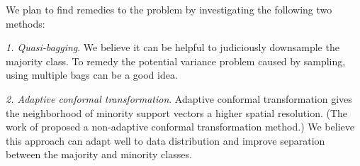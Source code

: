 We plan to find remedies to the problem by investigating 
the following two methods:
\begin{nlist}
 \item {\em 1. Quasi-bagging}.
  We believe it can be helpful to judiciously downsample the majority
  class.  To remedy the potential
  variance problem caused by sampling, using multiple bags
  can be a good idea.  
 \item {\em 2. Adaptive conformal transformation}.
  Adaptive conformal transformation  gives the neighborhood of
  minority support vectors a higher spatial resolution.
  (The work of \cite{Amari99} proposed a non-adaptive conformal
  transformation method.) We believe this approach can 
  adapt well to data distribution and improve separation
  between the majority and minority classes.
\end{nlist}

